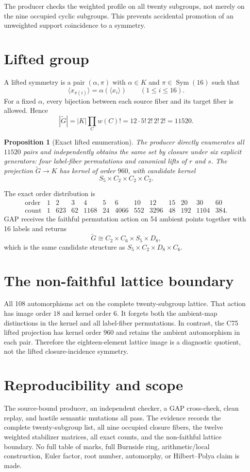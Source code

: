 \documentclass[10pt]{article}
\newtheorem{proposition}{Proposition}
\newcommand{\Sym}{\operatorname{Sym}}
\begin{document}
The producer checks the weighted profile on all twenty subgroups, not merely
on the nine occupied cyclic subgroups.  This prevents accidental promotion of
an unweighted support coincidence to a symmetry.

\section{Lifted group}
A lifted symmetry is a pair $(\alpha,\pi)$ with $\alpha\in K$ and
$\pi\in\Sym(16)$ such that
\[
 \langle x_{\pi(i)}\rangle=\alpha(\langle x_i\rangle)
 \qquad (1\le i\le16).
\]
For a fixed $\alpha$, every bijection between each source fiber and its target
fiber is allowed.  Hence
\begin{equation}
 |\widetilde G|=|K|\prod_C w(C)!
 =12\cdot5!\,2!\,2!\,2!=11520.
\end{equation}

\begin{proposition}[Exact lifted enumeration]
The producer directly enumerates all $11520$ pairs and independently obtains
the same set by closure under six explicit generators: four label-fiber
permutations and canonical lifts of $r$ and $s$.  The projection
$\widetilde G\to K$ has kernel of order $960$, with candidate kernel
\[
 S_5\times C_2\times C_2\times C_2.
\]
\end{proposition}

The exact order distribution is
\[
\begin{array}{c|rrrrrrrrrrrr}
\text{order}&1&2&3&4&5&6&10&12&15&20&30&60\\\hline
\text{count}&1&623&62&1168&24&4066&552&3296&48&192&1104&384.
\end{array}
\]
GAP receives the faithful permutation action on 54 ambient points together
with 16 labels and returns
\[
 \widetilde G\cong C_2\times C_6\times S_5\times D_8,
\]
which is the same candidate structure as $S_5\times C_2\times D_8\times C_6$.

\section{The non-faithful lattice boundary}
All 108 automorphisms act on the complete twenty-subgroup lattice.  That
action has image order $18$ and kernel order $6$.  It forgets both the
ambient-map distinctions in the kernel and all label-fiber permutations.  In
contrast, the C75 lifted projection has kernel order $960$ and retains the
ambient automorphism in each pair.  Therefore the eighteen-element lattice
image is a diagnostic quotient, not the lifted closure-incidence symmetry.

\section{Reproducibility and scope}
The source-bound producer, an independent checker, a GAP cross-check, clean
replay, and hostile semantic mutations all pass.  The evidence records the
complete twenty-subgroup list, all nine occupied closure fibers, the twelve
weighted stabilizer matrices, all exact counts, and the non-faithful lattice
boundary.  No full table of marks, full Burnside ring, arithmetic/local
construction, Euler factor, root number, automorphy, or Hilbert--Polya claim
is made.
\end{document}
